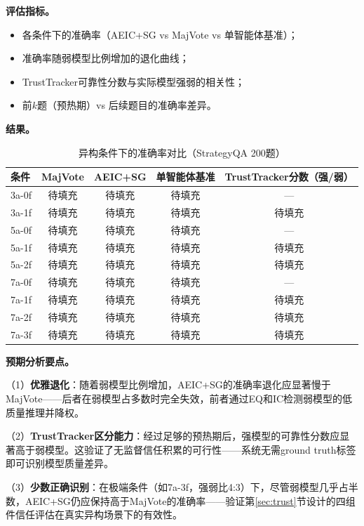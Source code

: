 \documentclass[12pt,a4paper,UTF8,fontset=fandol]{ctexart}
\begin{document}
\textbf{评估指标。}
\begin{itemize}[nosep]
    \item 各条件下的准确率（AEIC+SG vs MajVote vs 单智能体基准）；
    \item 准确率随弱模型比例增加的退化曲线；
    \item TrustTracker可靠性分数与实际模型强弱的相关性；
    \item 前$k$题（预热期）vs 后续题目的准确率差异。
\end{itemize}

\textbf{结果。}

\begin{table}[H]
\centering
\caption{异构条件下的准确率对比（StrategyQA 200题）}\label{tab:exp3_result}
\begin{tabular}{lcccc}
\toprule
条件 & MajVote & AEIC+SG & 单智能体基准 & TrustTracker分数（强/弱） \\
\midrule
3a-0f & 待填充 & 待填充 & 待填充 & — \\
3a-1f & 待填充 & 待填充 & 待填充 & 待填充 \\
5a-0f & 待填充 & 待填充 & 待填充 & — \\
5a-1f & 待填充 & 待填充 & 待填充 & 待填充 \\
5a-2f & 待填充 & 待填充 & 待填充 & 待填充 \\
7a-0f & 待填充 & 待填充 & 待填充 & — \\
7a-1f & 待填充 & 待填充 & 待填充 & 待填充 \\
7a-2f & 待填充 & 待填充 & 待填充 & 待填充 \\
7a-3f & 待填充 & 待填充 & 待填充 & 待填充 \\
\bottomrule
\end{tabular}
\end{table}

\textbf{预期分析要点。}

（1）\textbf{优雅退化}：随着弱模型比例增加，AEIC+SG的准确率退化应显著慢于MajVote——后者在弱模型占多数时完全失效，前者通过EQ和IC检测弱模型的低质量推理并降权。

（2）\textbf{TrustTracker区分能力}：经过足够的预热期后，强模型的可靠性分数应显著高于弱模型。这验证了无监督信任积累的可行性——系统无需ground truth标签即可识别模型质量差异。

（3）\textbf{少数正确识别}：在极端条件（如7a-3f，强弱比4:3）下，尽管弱模型几乎占半数，AEIC+SG仍应保持高于MajVote的准确率——验证第\ref{sec:trust}节设计的四组件信任评估在真实异构场景下的有效性。

\end{document}
